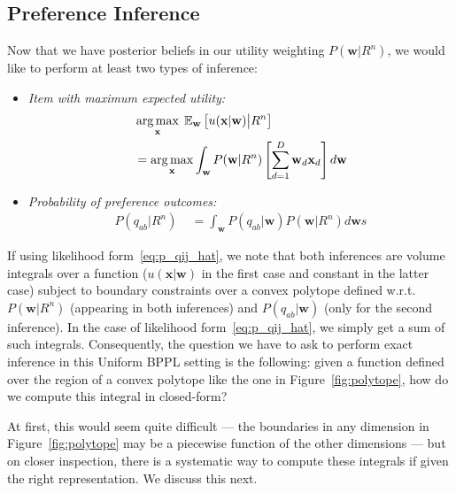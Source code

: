 \documentclass[letterpaper]{article}
\newcommand{\E}{\mathbb{E}}
\renewcommand{\vec}[1]{\mathbf{#1}}
\def\argmax{\operatornamewithlimits{arg\,max}}
\begin{document}
\subsection{Preference Inference}

\label{sec:bppl_inference}


Now that we have posterior beliefs in our utility weighting 
$P(\vec{w}|R^n)$, we would like to perform at least two types of inference:
\begin{itemize}
\item {\it Item with maximum expected utility:} 
\begin{align*}
\label{eq:maxEU}
& \argmax_{\vec{x}} \; \E_{\vec{w}} \left[ u(\vec{x}|\vec{w}) \big| R^n \right]\\ & = \argmax_{\vec{x}} \int_{\vec{w}} P(\vec{w}|R^n) \left[ \sum_{d=1}^{D} \vec{w}_d \vec{x}_d \right] d\vec{w}
\end{align*}
\item {\it Probability of preference outcomes:} 
\begin{align*}
P(q_{ab} | R^n) \; & = \int_\vec{w} P(q_{ab} | \vec{w}) P(\vec{w}|R^n) d\vec{w}s
\end{align*}
\end{itemize}
If using likelihood form~\eqref{eq:p_qij_hat}, we note that both
inferences are volume integrals over a function ($u(\vec{x}|\vec{w})$
in the first case and constant in the latter case) subject to boundary
constraints over a convex polytope defined w.r.t.\ $P(\vec{w}|R^n)$
(appearing in both inferences) and $P(q_{ab} | \vec{w})$ (only for the
second inference).  In the case of likelihood
form~\eqref{eq:p_qij_hat}, we simply get a sum of such integrals.
Consequently, the question we have to ask to perform exact inference
in this Uniform BPPL setting is the following: given a function
defined over the region of a convex polytope like the one in
Figure~\ref{fig:polytope}, how do we compute this integral in
closed-form?

At first, this would seem quite difficult --- the boundaries in any
dimension in Figure~\ref{fig:polytope} may be a piecewise function of
the other dimensions --- but on closer inspection, there is a
systematic way to compute these integrals if given the right
representation.  We discuss this next.
\end{document}
